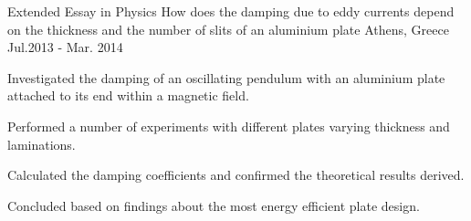 \begin{cventries}
	
	\cventry
	{Extended Essay in Physics}
	{How does the damping due to eddy currents depend on the thickness and the number of slits of an aluminium plate}
	{Athens, Greece}
	{Jul.2013 - Mar. 2014}
	{
		\begin{cvitems}
			\item {Investigated the damping of an oscillating pendulum with an aluminium plate attached to its end within a magnetic field.}
			\item {Performed a number of experiments with different plates varying thickness and laminations.}
			\item {Calculated the damping coefficients and confirmed the theoretical results derived.}
			\item {Concluded based on findings about the most energy efficient plate design.}
		\end{cvitems}
	}


\end{cventries}